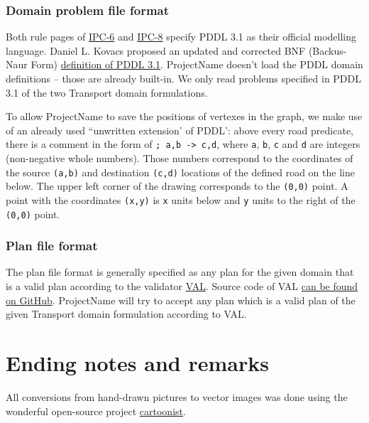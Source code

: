 \documentclass[10pt,a4paper,oneside]{article}
\newcommand{\TODO}[1]{{\textbf{TODO:} #1}} %
\newcommand{\pname}{ProjectName} %
\begin{document}
\subsubsection{Domain problem file format}\label{problem-format}

Both rule pages of \href{http://icaps-conference.org/ipc2008/deterministic/CompetitionRules.html}{IPC-6}
and \href{https://helios.hud.ac.uk/scommv/IPC-14/rules.html}{IPC-8}
specify PDDL 3.1 as their official modelling language. Daniel L. Kovacs proposed an updated and corrected BNF (Backus-Naur Form)
\href{https://helios.hud.ac.uk/scommv/IPC-14/repository/kovacs-pddl-3.1-2011.pdf}{definition of PDDL 3.1}.
\pname{} doesn't load the PDDL domain definitions -- those are already built-in. We only read problems specified in PDDL 3.1 of the two Transport domain formulations.

To allow \pname{} to save the positions of vertexes in the graph, we make use of an already used ``unwritten extension' of PDDL':
above every road predicate, there is a comment in the form of \verb+; a,b -> c,d+,
where \verb+a+, \verb+b+, \verb+c+ and \verb+d+ are integers (non-negative whole numbers).
Those numbers correspond to the coordinates of the source \verb+(a,b)+ and destination \verb+(c,d)+ locations of the defined road on the line below. The upper left corner of the drawing corresponds to the \verb+(0,0)+ point. A point with the coordinates \verb+(x,y)+ is \verb+x+ units below and \verb+y+ units to the right of the \verb+(0,0)+ point.

\subsubsection{Plan file format}\label{plan-format}

The plan file format is generally specified as any plan for the given domain that is a valid plan according to the validator \href{http://www.inf.kcl.ac.uk/research/groups/PLANNING/index.php?option=com_content&view=article&id=70&Itemid=77}{VAL}. Source code of VAL \href{https://github.com/KCL-Planning/VAL}{can be found on GitHub}. \pname{} will try to accept any plan which is a valid plan of the given Transport domain formulation according to VAL.

\section{Ending notes and remarks}

All conversions from hand-drawn pictures to vector images was done using the wonderful
open-source project \href{https://github.com/honzajavorek/cartoonist}{cartoonist}.





{
\footnotesize %
%
}
\end{document}
